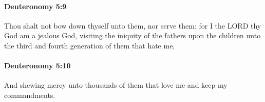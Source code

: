 		\paragraph{Deuteronomy 5:9} %
			\label{DEUTERONOMY-5-9}

			Thou shalt not bow down thyself unto them, nor serve them: for I the LORD thy God am a jealous God, visiting the iniquity of the fathers upon the children unto the third and fourth generation of them that hate me,


		\paragraph{Deuteronomy 5:10} %
			\label{DEUTERONOMY-5-10}

			And shewing mercy unto thousands of them that love me and keep my commandments.


